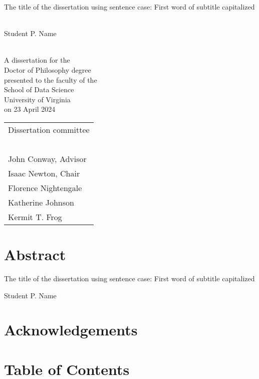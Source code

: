 \documentclass[12pt, letterpaper]{report}
\def\title{The title of the dissertation using sentence case: First word of subtitle capitalized}
\def\student{Student P. Name}
\begin{document}

\thispagestyle{empty}
\rule{0pt}{0pt}{\centering
\vfill
{\LARGE\title\par}
\vfill
\rule{0pt}{1in}\\
{\Large\student}\\
\rule{0pt}{1in}\\
\vfill
{\large A dissertation for the\\
Doctor of Philosophy degree\\
presented to the faculty of the\\
School of Data Science\\
University of Virginia\\
on 23 April 2024\\
}}
\vfill
\rule{0pt}{0pt}
\newpage
\thispagestyle{empty}
\rule{0in}{1in}
\begin{center}
{\large 
\begin{tabular}{l}
Dissertation committee\\
    \ \\
John Conway, Advisor\\
Isaac Newton, Chair\\
Florence Nightengale\\
Katherine Johnson\\
Kermit T. Frog
\end{tabular}
}
\end{center}
\newpage
\chapter*{Abstract}

\begin{center}
{\large\title\par}

{\student}
\end{center}


\newpage
\chapter*{Acknowledgements}



\newpage
\renewcommand{\contentsname}{}
\chapter*{Table of Contents}
\tableofcontents
\newpage
\end{document}
